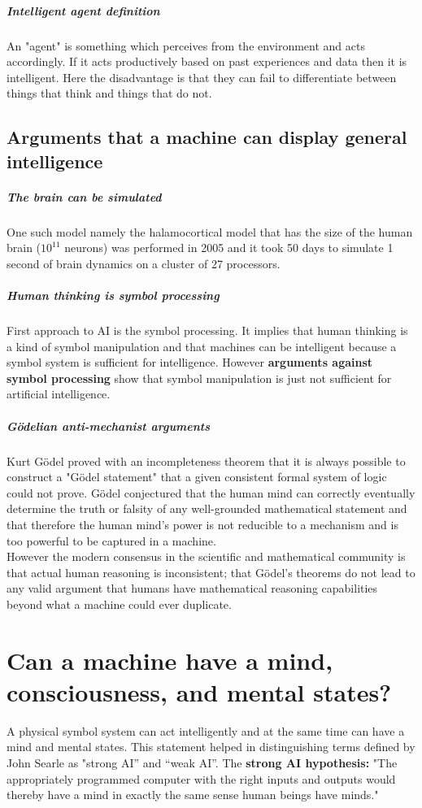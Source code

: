 \documentclass[10pt,a4paper,twoside]{article}
\begin{document}
\subparagraph{Intelligent agent definition}
An "agent" is something which perceives from the environment and acts accordingly. If it acts productively based on past experiences and data then it is intelligent. Here the disadvantage is that they can fail to differentiate between things that think and things that do not.

\subsection{Arguments that a machine can display general intelligence}
\subparagraph{The brain can be simulated}
One such model namely the halamocortical model that has the size of the human brain (\begin{math} 10^{11} \end{math} neurons) was performed in 2005 and it took 50 days to simulate 1 second of brain dynamics on a cluster of 27 processors.

\subparagraph{Human thinking is symbol processing}
First approach to AI is the symbol processing. It implies that human thinking is a kind of symbol manipulation and that machines can be intelligent because a symbol system is sufficient for intelligence. However \textbf{arguments against symbol processing} show that symbol manipulation is just not sufficient for artificial intelligence. 

\subparagraph{Gödelian anti-mechanist arguments}
Kurt Gödel proved with an incompleteness theorem that it is always possible to construct a "Gödel statement" that a given consistent formal system of logic could not prove. Gödel conjectured that the human mind can correctly eventually determine the truth or falsity of any well-grounded mathematical statement and that therefore the human mind's power is not reducible to a mechanism and is too powerful to be captured in a machine.\\
However the modern consensus in the scientific and mathematical community is that actual human reasoning is inconsistent; that Gödel's theorems do not lead to any valid argument that humans have mathematical reasoning capabilities beyond what a machine could ever duplicate. 

\section{Can a machine have a mind, consciousness, and mental states?}
A physical symbol system can act intelligently and at the same time can have a mind and mental states. This statement helped in distinguishing terms defined by John Searle as "strong AI” and “weak AI”. The \textbf{strong AI hypothesis:} "The appropriately programmed computer with the right inputs and outputs would thereby have a mind in exactly the same sense human beings have minds."
\end{document}
